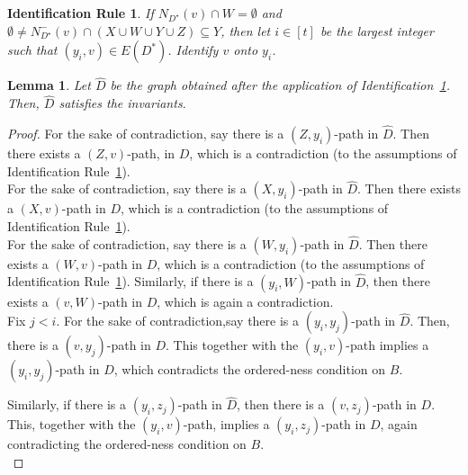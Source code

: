 \documentclass[a4paper,11pt]{article}
\theoremstyle{plain}
\newtheorem{lemma}[theorem]{Lemma}
\newtheorem{identification rule}{Identification Rule}
\theoremstyle{definition}
\theoremstyle{remark}
\begin{document}
\begin{identification rule}\label{ir:emptyA}
If $N_{D^{\star}}(v) \cap W=\emptyset$ and $\emptyset \neq N_{D^{\star}}^-(v) \cap (X \cup W \cup Y \cup Z) \subseteq Y$, then 
let $i \in [t]$ be the largest integer such that $(y_{i},v) \in E(D^*)$.
Identify $v$ onto $y_{i}$.
\end{identification rule}

\begin{lemma}\label{lem:iremptyA-safe}
Let $\widehat{D}$ be the graph obtained after the application of Identification~\ref{ir:emptyA}. Then, $\widehat{D}$ satisfies the invariants.
\end{lemma}

\begin{proof}
 For the sake of contradiction, say there is a $(Z,y_i)$-path in $\widehat{D}$. 
Then there exists a $(Z,v)$-path, in $D$, which is a contradiction (to the assumptions of Identification Rule~\ref{ir:emptyA}).\\

 For the sake of contradiction, say there is a $(X,y_i)$-path in $\widehat{D}$. 
Then there exists a $(X,v)$-path in $D$, which is a contradiction (to the assumptions of Identification Rule~\ref{ir:emptyA}).\\

 For the sake of contradiction, 
say there is a $(W,y_i)$-path in $\widehat{D}$. 
Then there exists a $(W,v)$-path in $D$, which is a contradiction (to the assumptions of Identification Rule~\ref{ir:emptyA}). Similarly,  if there is a $(y_i,W)$-path in $\widehat{D}$, then there exists a $(v,W)$-path in $D$, which is again a contradiction.\\

Fix $j <i$.
For the sake of contradiction,say there is a $(y_i,y_j)$-path in $\widehat{D}$. Then, there is a $(v,y_j)$-path in $D$. This together with the $(y_i,v)$-path implies a $(y_i,y_j)$-path in $D$, which contradicts the ordered-ness condition on $B$.

Similarly, if there is a $(y_i,z_j)$-path in $\widehat{D}$, then there is a $(v,z_j)$-path in $D$. This, together with the $(y_i,v)$-path, implies a $(y_i,z_j)$-path in $D$, again contradicting the ordered-ness condition on $B$.\\


\end{proof}
\end{document}
